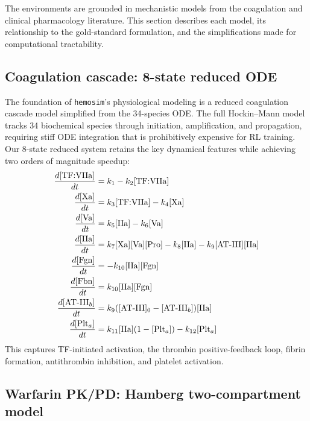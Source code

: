 \documentclass[11pt]{article}
\begin{document}
The environments are grounded in mechanistic models from the coagulation and clinical pharmacology literature. This section describes each model, its relationship to the gold-standard formulation, and the simplifications made for computational tractability.

\subsection{Coagulation cascade: 8-state reduced ODE}

The foundation of \texttt{hemosim}'s physiological modeling is a reduced coagulation cascade model simplified from the \citet{hockin2002} 34-species ODE. The full Hockin--Mann model tracks 34 biochemical species through initiation, amplification, and propagation, requiring stiff ODE integration that is prohibitively expensive for RL training. Our 8-state reduced system retains the key dynamical features while achieving two orders of magnitude speedup:
\begin{align}
  \frac{d[\text{TF:VIIa}]}{dt} &= k_1 - k_2 [\text{TF:VIIa}] \label{eq:coag_tfviia} \\
  \frac{d[\text{Xa}]}{dt} &= k_3 [\text{TF:VIIa}] - k_4 [\text{Xa}] \\
  \frac{d[\text{Va}]}{dt} &= k_5 [\text{IIa}] - k_6 [\text{Va}] \\
  \frac{d[\text{IIa}]}{dt} &= k_7 [\text{Xa}][\text{Va}][\text{Pro}] - k_8 [\text{IIa}] - k_9 [\text{AT\text{-}III}][\text{IIa}] \\
  \frac{d[\text{Fgn}]}{dt} &= -k_{10} [\text{IIa}][\text{Fgn}] \\
  \frac{d[\text{Fbn}]}{dt} &= k_{10} [\text{IIa}][\text{Fgn}] \\
  \frac{d[\text{AT\text{-}III}_b]}{dt} &= k_9 ([\text{AT\text{-}III}]_0 - [\text{AT\text{-}III}_b])[\text{IIa}] \\
  \frac{d[\text{Plt}_a]}{dt} &= k_{11} [\text{IIa}](1 - [\text{Plt}_a]) - k_{12} [\text{Plt}_a]
\end{align}
This captures TF-initiated activation, the thrombin positive-feedback loop, fibrin formation, antithrombin inhibition, and platelet activation.

\subsection{Warfarin PK/PD: Hamberg two-compartment model}
\end{document}

